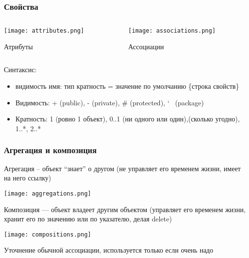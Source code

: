 \documentclass{../../slides-style}
\begin{document}
    \begin{frame}
        \frametitle{Свойства}
        \begin{columns}
            \begin{column}{0.3\textwidth}
                \begin{center}
                    \texttt{[image: attributes.png]}

                    Атрибуты
                \end{center}
            \end{column}
            \begin{column}{0.7\textwidth}
                \begin{center}
                    \texttt{[image: associations.png]}

                    Ассоциации
                \end{center}
            \end{column}
        \end{columns}
        \bigskip
        Синтаксис:
        \begin{itemize}
            \item видимость имя: тип кратность = значение по умолчанию \{строка свойств\}
            \item Видимость: + (public), - (private), \# (protected), \char`~ (package)
            \item Кратность: 1 (ровно 1 объект), 0..1 (ни одного или один),\newline * (сколько угодно), 1..*, 2..*
        \end{itemize}
    \end{frame}

    \begin{frame}
        \frametitle{Агрегация и композиция}
        Агрегация – объект ``знает'' о другом (не управляет его временем жизни, имеет на него ссылку)
        \begin{center}
            \texttt{[image: aggregations.png]}
        \end{center}
        Композиция --- объект владеет другим объектом (управляет его временем жизни, хранит его по значению или по указателю, делая delete)
        \begin{center}
            \texttt{[image: compositions.png]}
        \end{center}
        Уточнение обычной ассоциации, используется только если очень надо
    \end{frame}
\end{document}

